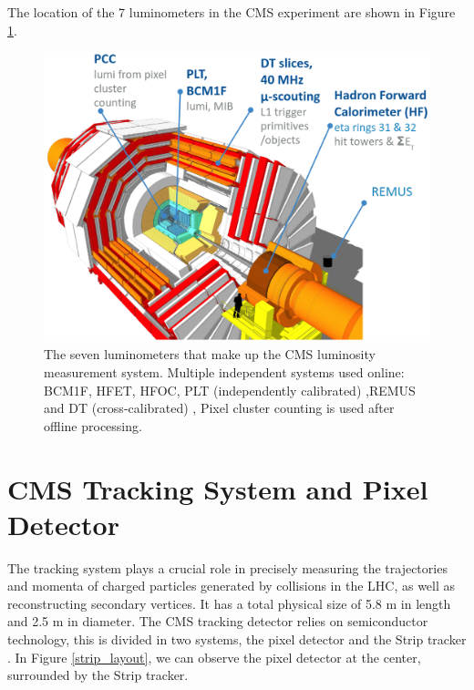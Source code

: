 The location of the 7 luminometers in the CMS experiment are shown in Figure \ref{luminometers}.

\begin{center}
  \begin{figure}[ht]
    \centering
    \includegraphics[scale=.3]{Chapter2/detectors.png}
    \caption[Layout of the luminometers in the CMS detector]{The seven luminometers that make up the CMS luminosity measurement system. Multiple independent systems used online: BCM1F, HFET, HFOC, PLT (independently calibrated) ,REMUS and  DT (cross-calibrated) , Pixel cluster counting is used after offline processing.}
    \label{luminometers}
  \end{figure}
\end{center}

\section{CMS Tracking System and Pixel Detector}

The tracking system plays a crucial role in precisely measuring the trajectories and momenta of charged particles generated by collisions in the LHC, as well as reconstructing secondary vertices. It has a total physical size of 5.8 m in length and 2.5 m in diameter. 
The CMS tracking detector relies on semiconductor technology, this is divided in two systems, the pixel detector and the Strip tracker \cite{CMS_Exp_2008}. In Figure \ref{strip_layout}, we can observe the pixel detector at the center, surrounded by the Strip tracker.\\

